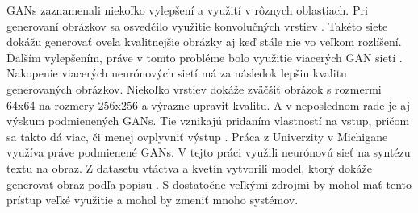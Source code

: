 GANs zaznamenali niekoľko vylepšení a využití v rôznych oblastiach. Pri generovaní obrázkov sa osvedčilo využitie konvolučných vrstiev \cite{DCGAN}.
Takéto siete dokážu generovať oveľa kvalitnejšie obrázky aj keď stále nie vo veľkom rozlíšení.
Ďalším vylepšením, práve v tomto probléme bolo využitie viacerých GAN sietí \cite{stackGAN}. Nakopenie viacerých neurónových sietí má za následok lepšiu kvalitu generovaných obrázkov.
Niekoľko vrstiev dokáže zväčšiť obrázok s rozmermi 64x64 na rozmery 256x256 a výrazne upraviť kvalitu. A v neposlednom rade je aj výskum podmienených GANs.
Tie vznikajú pridaním vlastností na vstup, pričom sa takto dá viac, či menej ovplyvniť výstup \cite{conGAN}.
Práca z Univerzity v Michigane využíva práve podmienené GANs. V tejto práci využili neurónovú sieť na syntézu textu na obraz.
Z datasetu vtáctva a kvetín vytvorili model, ktorý dokáže generovať obraz podľa popisu \cite{text2image}.
S dostatočne veľkými zdrojmi by mohol mať tento prístup veľké využitie a mohol by zmeniť mnoho systémov. 
